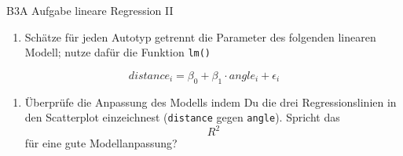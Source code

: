 \documentclass[ignorenonframetext,]{beamer}
\providecommand{\tightlist}{%
  \setlength{\itemsep}{0pt}\setlength{\parskip}{0pt}}
\begin{document}
\begin{frame}[fragile]{B3A Aufgabe lineare Regression II}

\begin{enumerate}
\def\labelenumi{(\alph{enumi})}
\setcounter{enumi}{2}
\tightlist
\item
  Schätze für jeden Autotyp getrennt die Parameter des folgenden
  linearen Modell; nutze dafür die Funktion \texttt{lm()}
\end{enumerate}

\[ distance_i= \beta_0 + \beta_1 \cdot angle_i + \epsilon_i\]

\begin{enumerate}
\def\labelenumi{(\alph{enumi})}
\setcounter{enumi}{3}
\tightlist
\item
  Überprüfe die Anpassung des Modells indem Du die drei
  Regressionslinien in den Scatterplot einzeichnest (\texttt{distance}
  gegen \texttt{angle}). Spricht das \[ R^2 \] für eine gute
  Modellanpassung?
\end{enumerate}

\end{frame}
\end{document}
